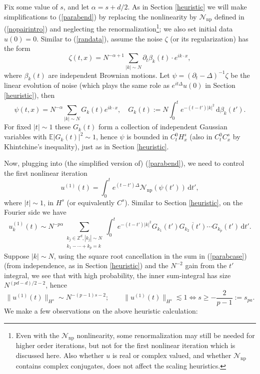 \documentclass[11 pt,reqno]{amsart}
\theoremstyle{definition}
\theoremstyle{remark}
\numberwithin{equation}{section}
\newcommand{\Nc}{\mathcal{N}}
\newcommand{\Eb}{\mathbb{E}}
\newcommand{\Zb}{\mathbb{Z}}
\begin{document}
{Fix some value of $s$, and let $\alpha=s+d/2$. As in Section \ref{heuristic} we will make simplifications to (\ref{parabend}) by replacing the nonlinearity by $\Nc_{\mathrm{np}}$ defined in (\ref{nopairintro}) and neglecting the renormalization\footnote{Even with the $\Nc_{\mathrm{np}}$ nonlinearity, some renormalization may still be needed for higher order iterations, but not for the first nonlinear iteration which is discussed here. Also whether $u$ is real or complex valued, and whether $\Nc_{\mathrm{np}}$ contains complex conjugates, does not affect the scaling heuristics.}; we also set initial data $u(0)=0$. Similar to (\ref{randata}), assume the noise $\zeta$ (or its regularization) has the form
\[\zeta(t,x)=N^{-\alpha+1}\sum_{|k|\sim N}\partial_t{\beta_k}(t)\cdot e^{ik\cdot x},\] where $\beta_k(t)$ are independent Brownian motions. Let $\psi=(\partial_t-\Delta)^{-1}\zeta$ be the linear evolution of noise (which plays the same role as $e^{it\Delta}u(0)$ in Section \ref{heuristic}), then
\[\psi(t,x)=N^{-\alpha}\sum_{|k|\sim N}G_k(t)e^{ik\cdot x},\quad G_k(t):=N\int_0^t e^{-(t-t')|k|^2}\,\mathrm{d}\beta_k(t').\] For fixed $|t|\sim 1$ these $G_k(t)$ form a collection of independent Gaussian variables with $\Eb|G_k(t)|^2\sim 1$, hence $\psi$ is bounded in $C_t^0H_x^s$ (also in $C_t^0C_x^s$ by Khintchine's inequality), just as in Section \ref{heuristic}.

Now, plugging into (the simplified version of) (\ref{parabend}), we need to control the first nonlinear iteration
\begin{equation}u^{(1)}(t)=\int_0^t e^{(t-t')\Delta}\Nc_{\mathrm{np}}(\psi(t'))\,\mathrm{d}t',
\end{equation} where $|t|\sim 1$, in $H^s$ (or equivalently $C^s$). Similar to Section \ref{heuristic}, on the Fourier side we have
\begin{equation}\label{parabcase}u_k^{(1)}(t)\sim N^{-p\alpha}\sum_{\substack{k_j\in\Zb^d,|k_j|\sim N\\k_1-\cdots +k_p=k}}\int_0^t e^{-(t-t')|k|^2}G_{k_1}(t')\overline{G_{k_2}(t')}\cdots G_{k_p}(t')\,\mathrm{d}t'.\end{equation} Suppose $|k|\sim N$, using the square root cancellation in the sum in (\ref{parabcase}) (from independence, as in Section \ref{heuristic}) and the $N^{-2}$ gain from the $t'$ integral, we see that with high probability, the inner sum-integral has size $N^{(pd-d)/2-2}$, hence
\[\|u^{(1)}(t)\|_{H^s}\sim N^{-(p-1)s-2};\qquad \|u^{(1)}(t)\|_{H^s}\lesssim 1\Leftrightarrow s\geq  -\frac{2}{p-1}:=s_{pa}.\]
We make a few observations on the above heuristic calculation:

}
\end{document}

